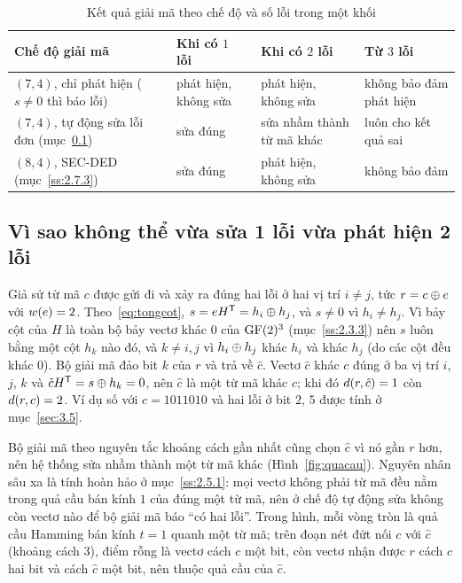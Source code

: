 \begin{table}[H]
\centering\small\renewcommand{\arraystretch}{1.1}
\caption{Kết quả giải mã theo chế độ và số lỗi trong một khối}
\label{tab:chedo}
\begin{tabular}{|p{4.6cm}|p{2.7cm}|p{3.5cm}|p{2.9cm}|}
\hline
\textbf{Chế độ giải mã} & \textbf{Khi có $1$ lỗi} & \textbf{Khi có $2$ lỗi} & \textbf{Từ $3$ lỗi}\\ \hline
$(7,4)$, chỉ phát hiện ($s \neq 0$ thì báo lỗi) & phát hiện, không sửa & phát hiện, không sửa & không bảo đảm phát hiện\\ \hline
$(7,4)$, tự động sửa lỗi đơn (mục~\ref{ss:2.5.3}) & sửa đúng & sửa nhầm thành từ mã khác & luôn cho kết quả sai\\ \hline
$(8,4)$, SEC-DED (mục~\ref{ss:2.7.3}) & sửa đúng & phát hiện, không sửa & không bảo đảm\\ \hline
\end{tabular}
\end{table}

\subsection{Vì sao không thể vừa sửa 1 lỗi vừa phát hiện 2 lỗi}
\label{ss:2.5.3}

Giả sử từ mã $c$ được gửi đi và xảy ra đúng hai lỗi ở hai vị trí $i \neq j$,
tức $r = c \oplus e$ với $w(e) = 2$. Theo~\eqref{eq:tongcot},
$s = eH^{\mathsf{T}} = h_i \oplus h_j$, và $s \neq 0$ vì
$h_i \neq h_j$. Vì bảy cột của $H$ là toàn bộ bảy vectơ khác $0$ của
$\mathrm{GF}(2)^{3}$ (mục~\ref{ss:2.3.3}) nên $s$ luôn bằng một cột $h_k$ nào đó, và
$k \neq i, j$ vì $h_i \oplus h_j$ khác $h_i$ và khác $h_j$ (do các cột đều khác
$0$). Bộ giải mã đảo bit $k$ của $r$ và trả về $\hat{c}$. Vectơ $\hat{c}$ khác
$c$ đúng ở ba vị trí $i$, $j$, $k$ và $\hat{c}H^{\mathsf{T}} = s \oplus h_k = 0$, nên
$\hat{c}$ là một từ mã khác $c$; khi đó $d(r,\hat{c}) = 1$ còn
$d(r,c) = 2$. Ví dụ số với $c = 1011010$ và hai lỗi ở bit $2$, $5$ được
tính ở mục~\ref{sec:3.5}.

Bộ giải mã theo nguyên tắc khoảng cách gần nhất cũng chọn $\hat{c}$ vì nó gần
$r$ hơn, nên hệ thống sửa nhầm thành một từ mã khác (Hình~\ref{fig:quacau}).
Nguyên nhân sâu xa là tính hoàn hảo ở mục~\ref{ss:2.5.1}: mọi vectơ không phải
từ mã đều nằm trong quả cầu bán kính $1$ của đúng một từ mã, nên ở chế độ tự
động sửa không còn vectơ nào để bộ giải mã báo ``có hai lỗi''. Trong hình, mỗi
vòng tròn là quả cầu Hamming bán kính $t = 1$ quanh một từ mã; trên đoạn nét
đứt nối $c$ với $\hat{c}$ (khoảng cách $3$), điểm rỗng là vectơ cách $c$ một
bit, còn vectơ nhận được $r$ cách $c$ hai bit và cách $\hat{c}$ một bit, nên
thuộc quả cầu của $\hat{c}$.

